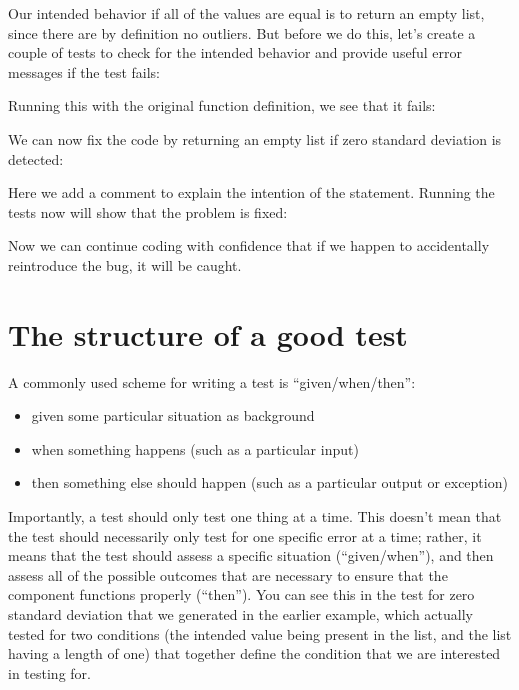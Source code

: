 Our intended behavior if all of the values are equal is to return an empty list, since there are by definition no outliers.
But before we do this, let's create a couple of tests to check for the intended behavior and provide useful error messages if the test fails:



Running this with the original function definition, we see that it fails:



We can now fix the code by returning an empty list if zero standard deviation is detected:



Here we add a comment to explain the intention of the statement.
Running the tests now will show that the problem is fixed:



Now we can continue coding with confidence that if we happen to accidentally reintroduce the bug, it will be caught.

\section{The structure of a good test}

A commonly used scheme for writing a test is ``given/when/then'':

\begin{itemize}
\item given some particular situation as background
\item when something happens (such as a particular input)
\item then something else should happen (such as a particular output or exception)
\end{itemize}

Importantly, a test should only test one thing at a time.
This doesn't mean that the test should necessarily only test for one specific error at a time; rather, it means that the test should assess a specific situation (``given/when''), and then assess all of the possible outcomes that are necessary to ensure that the component functions properly (``then'').
You can see this in the test for zero standard deviation that we generated in the earlier example, which actually tested for two conditions (the intended value being present in the list, and the list having a length of one) that together define the condition that we are interested in testing for.


